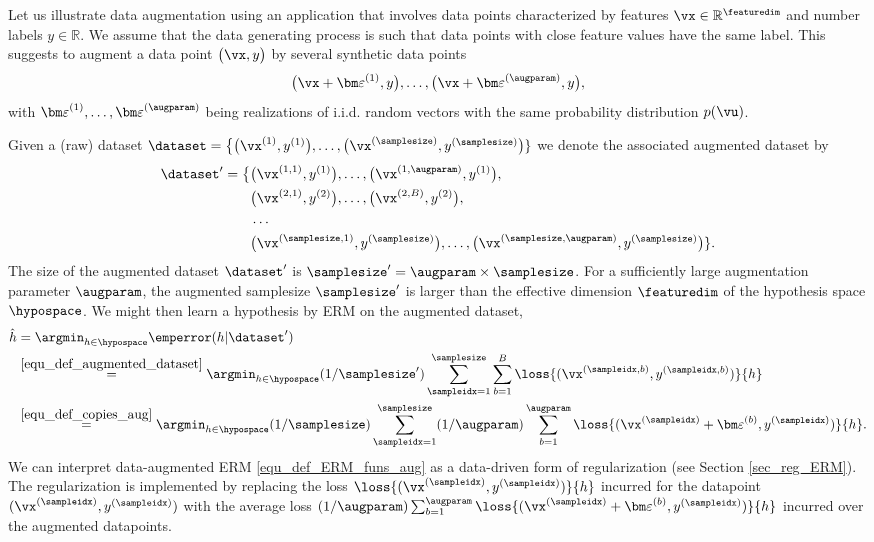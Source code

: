 \documentclass[12pt]{report}
\newcommand{\featurelen}{\featuredim}
\begin{document}
Let us illustrate data augmentation using an application that involves data points characterized 
by features $\vx \in \mathbb{R}^{\featuredim}$ and number labels $y \in \mathbb{R}$. We assume 
that the data generating process is such that data points with close feature values have the same label. 
This suggests to augment a data point $\big(\vx,y\big)$ by several synthetic data points 
\begin{equation} 
\label{equ_def_copies_aug}
\big(\vx+{\bm \varepsilon}^{(1)},y\big),\ldots,\big(\vx+{\bm \varepsilon}^{(\augparam)},y\big), 
\end{equation}
with ${\bm \varepsilon}^{(1)},\ldots,{\bm \varepsilon}^{(\augparam)}$ being realizations of i.i.d. 
random vectors with the same probability distribution $p(\vu)$. 

Given a (raw) dataset $\dataset = \big\{ \big(\vx^{(1)},y^{(1)}\big),\ldots, \big(\vx^{(\samplesize)},y^{(\samplesize)}\big) \} $ 
we denote the associated augmented dataset by 
\begin{align} 
\label{equ_def_augmented_dataset}
\dataset' = \big\{ &\big(\vx^{(1,1)},y^{(1)}\big), \ldots, \big(\vx^{(1,\augparam)},y^{(1)}\big), \nonumber \\ 
                                  &\big(\vx^{(2,1)},y^{(2)}\big), \ldots, \big(\vx^{(2,B)},y^{(2)}\big), \nonumber \\ 
                                  & \ldots \nonumber \\ 
 &\big(\vx^{(\samplesize,1)},y^{(\samplesize)}\big), \ldots, \big(\vx^{(\samplesize,\augparam)},y^{(\samplesize)}\big) \}. 
\end{align} 
The size of the augmented dataset $\dataset'$ is $ \samplesize' = \augparam \times \samplesize$. 
For a sufficiently large augmentation parameter $\augparam$, the augmented samplesize $\samplesize'$ is 
larger than the effective dimension $\featurelen$ of the hypothesis space $\hypospace$. We might 
then learn a hypothesis by ERM on the augmented dataset, 
\begin{align}
\label{equ_def_ERM_funs_aug}
\hat{h} & = \argmin_{h \in \hypospace} \emperror(h|\dataset') \nonumber \\ 
& \stackrel{\eqref{equ_def_augmented_dataset}}{=}  \argmin_{h \in \hypospace} (1/\samplesize') \sum_{\sampleidx=1}^{\samplesize} \sum_{b=1}^{B} \loss{(\vx^{(\sampleidx,b)},y^{(\sampleidx,b)})}{h} \nonumber \\ 
& \stackrel{\eqref{equ_def_copies_aug}}{=}  \argmin_{h \in \hypospace} (1/\samplesize) \sum_{\sampleidx=1}^{\samplesize} (1/\augparam)\sum_{b=1}^{\augparam} \loss{(\vx^{(\sampleidx)}+{\bm \varepsilon}^{(b)},y^{(\sampleidx)})}{h}. 
\end{align}
We can interpret data-augmented ERM \eqref{equ_def_ERM_funs_aug} as a data-driven 
form of regularization (see Section \ref{sec_reg_ERM}). The regularization is implemented 
by replacing the loss $\loss{(\vx^{(\sampleidx)},y^{(\sampleidx)})}{h}$ incurred for the 
datapoint $(\vx^{(\sampleidx)},y^{(\sampleidx)})$ with the average 
loss $(1/\augparam)\sum_{b=1}^{\augparam} \loss{(\vx^{(\sampleidx)}+{\bm \varepsilon}^{(b)},y^{(\sampleidx)})}{h}$ 
incurred over the augmented datapoints. 
\end{document}
